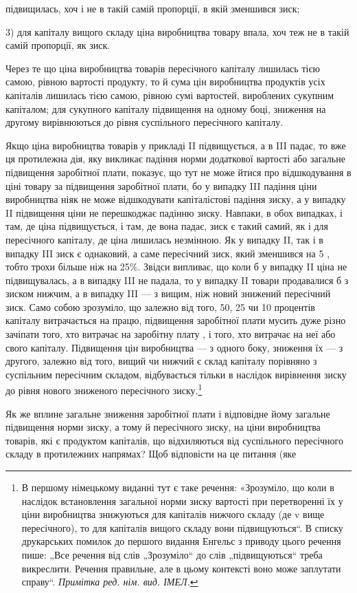 \parcont{}  %
підвищилась, хоч і не в такій самій пропорції, в якій зменшився
зиск;

3) для капіталу вищого складу ціна виробництва товару впала,
хоч теж не в такій самій пропорції, як зиск.

Через те що ціна виробництва товарів пересічного капіталу
лишилась тією самою, рівною вартості продукту, то й сума цін
виробництва продуктів усіх капіталів лишилась тією самою,
рівною сумі вартостей, вироблених сукупним капіталом; для
сукупного капіталу підвищення на одному боці, зниження на
другому вирівнюються до рівня суспільного пересічного капіталу.

Якщо ціна виробництва товарів у прикладі II підвищується,
а в III падає, то вже ця протилежна дія, яку викликає падіння
норми додаткової вартості або загальне підвищення заробітної
плати, показує, що тут не може йтися про відшкодування в
ціні товару за підвищення заробітної плати, бо у випадку III падіння
ціни виробництва ніяк не може відшкодувати капіталістові
падіння зиску, а у випадку II підвищення ціни не перешкоджає
падінню зиску. Навпаки, в обох випадках, і там, де ціна підвищується,
і там, де вона падає, зиск є такий самий, як і для
пересічного капіталу, де ціна лишилась незмінною. Як у випадку
II, так і в випадку III зиск є однаковий, а саме пересічний
зиск, який зменшився на 5 , тобто трохи більше ніж на 25\%.
Звідси випливає, що коли б у випадку II ціна не підвищувалась,
а в випадку III не падала, то у випадку II товари продавалися б
з зиском нижчим, а в випадку III — з вищим, ніж новий знижений
пересічний зиск. Само собою зрозуміло, що залежно від
того, 50, 25 чи 10 процентів капіталу витрачається на працю,
підвищення заробітної плати мусить дуже різно зачіпати
того, хто витрачає на заробітну плату , і того, хто витрачає
на неї  або  свого капіталу. Підвищення цін виробництва
— з одного боку, зниження їх — з другого, залежно від
того, вищий чи нижчий є склад капіталу порівняно з суспільним
пересічним складом, відбувається тільки в наслідок вирівнення
зиску до рівня нового зниженого пересічного зиску.\footnote*{
В першому німецькому виданні тут є таке речення: «Зрозуміло, що коли
в наслідок встановлення загальної норми зиску вартості при перетворенні їх
у ціни виробництва знижуються для капіталів нижчого складу (де v вище пересічного),
то для капіталів вищого складу вони підвищуються“. В списку друкарських
помилок до першого видання Енгельс з приводу цього речення
пише: „Все речення від слів „Зрозуміло“ до слів „підвищуються“ треба викреслити.
Речення правильне, але в цьому контексті воно може заплутати
справу“. \emph{Примітка ред. нім. вид. ІМЕЛ.}
}

Як же вплине загальне зниження заробітної плати і відповідне
йому загальне підвищення норми зиску, а тому й пересічного
зиску, на ціни виробництва товарів, які є продуктом
капіталів, що відхиляються від суспільного пересічного складу
в протилежних напрямах? Щоб відповісти на це питання (яке
\parbreak{}  %
